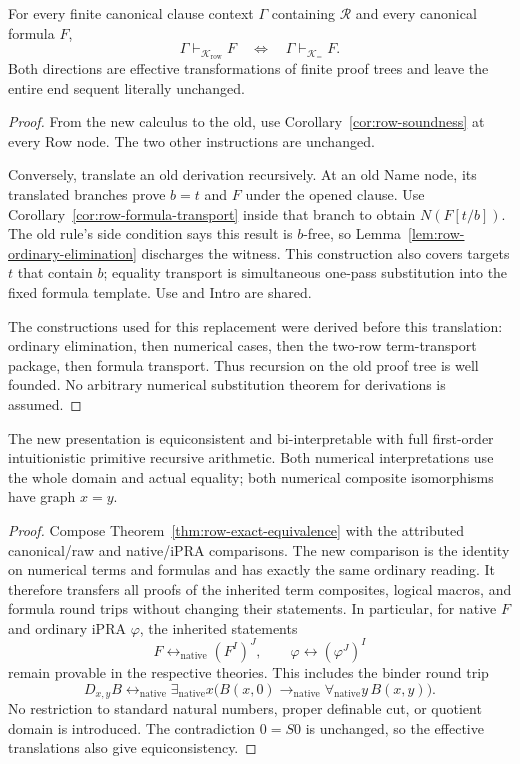 \begin{theorem}
\label{thm:row-exact-equivalence}
For every finite canonical clause context $\Gamma$ containing
$\mathcal R$ and every canonical formula $F$,
\[
 \Gamma\vdash_{\mathcal K_{\mathrm{row}}}F
 \quad\Longleftrightarrow\quad
 \Gamma\vdash_{\mathcal K_{=}}F.
\]
Both directions are effective transformations of finite proof trees and
leave the entire end sequent literally unchanged.
\end{theorem}
\begin{proof}
From the new calculus to the old, use
Corollary~\ref{cor:row-soundness} at every Row node.  The two other
instructions are unchanged.

Conversely, translate an old derivation recursively.  At an old Name
node, its translated branches prove $b=t$ and $F$ under the opened
clause.  Use Corollary~\ref{cor:row-formula-transport} inside that branch
to obtain $N(F[t/b])$.  The old rule's side condition says this result is
$b$-free, so Lemma~\ref{lem:row-ordinary-elimination} discharges the
witness.  This construction also covers targets $t$ that contain $b$;
equality transport is simultaneous one-pass substitution into the fixed
formula template.  Use and Intro are shared.

The constructions used for this replacement were derived before this
translation: ordinary elimination, then numerical cases, then the
two-row term-transport package, then formula transport.  Thus recursion
on the old proof tree is well founded.  No arbitrary numerical
substitution theorem for derivations is assumed.
\end{proof}

\begin{corollary}
\label{cor:row-ipra}
The new presentation is equiconsistent and bi-interpretable with full
first-order intuitionistic primitive recursive arithmetic.  Both
numerical interpretations use the whole domain and actual equality;
both numerical composite isomorphisms have graph $x=y$.
\end{corollary}
\begin{proof}
Compose Theorem~\ref{thm:row-exact-equivalence} with the attributed
canonical/raw and native/iPRA comparisons.  The new comparison is the
identity on numerical terms and formulas and has exactly the same
ordinary reading.  It therefore transfers all proofs of the inherited
term composites, logical macros, and formula round trips without
changing their statements.  In particular, for native $F$ and ordinary
iPRA $\varphi$, the inherited statements
\[
 F\leftrightarrow_{\mathrm{native}}(F^I)^J,
 \qquad
 \varphi\leftrightarrow(\varphi^J)^I
\]
remain provable in the respective theories.  This includes the binder
round trip
\[
 D_{x,y}B\leftrightarrow_{\mathrm{native}}
 \exists_{\mathrm{native}}x\bigl(
 B(x,0)\to_{\mathrm{native}}
 \forall_{\mathrm{native}}y\,B(x,y)\bigr).
\]
No restriction to standard natural numbers, proper definable cut, or
quotient domain is introduced.  The contradiction $0=S0$ is unchanged,
so the effective translations also give equiconsistency.
\end{proof}

